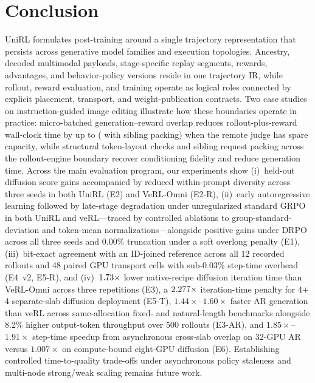 \documentclass[10pt]{article}
\begin{document}
\section{Conclusion}
\label{sec:conclusion}

UniRL formulates post-training around a single trajectory representation that persists across generative model families and execution topologies.
Ancestry, decoded multimodal payloads, stage-specific replay segments, rewards, advantages, and behavior-policy versions reside in one trajectory IR, while rollout, reward evaluation, and training operate as logical roles connected by explicit placement, transport, and weight-publication contracts.
Two case studies on instruction-guided image editing illustrate how these boundaries operate in practice: micro-batched generation--reward overlap reduces rollout-plus-reward wall-clock time by up to \RSSmallOverlapSaving{} (\RSSmallPackedSaving{} with sibling packing) when the remote judge has spare capacity, while structural token-layout checks and sibling request packing across the rollout-engine boundary recover conditioning fidelity and reduce generation time.
Across the main evaluation program, our experiments show (i)~held-out diffusion score gains accompanied by reduced within-prompt diversity across three seeds in both UniRL (E2) and VeRL-Omni (E2-R), (ii)~early autoregressive learning followed by late-stage degradation under unregularized standard GRPO in both UniRL and veRL---traced by controlled ablations to group-standard-deviation and token-mean normalizations---alongside positive gains under DRPO across all three seeds and $0.00\%$ truncation under a soft overlong penalty (E1), (iii)~bit-exact agreement with an ID-joined reference across all 12 recorded rollouts and 48 paired GPU transport cells with sub-0.03\% step-time overhead (E4~v2, E5-R), and (iv)~$1.73{}\times$ lower native-recipe diffusion iteration time than VeRL-Omni across three repetitions (E3), a $2.277{}\times$ iteration-time penalty for 4$+$4 separate-slab diffusion deployment (E5-T), $1.44\times$--$1.60\times$ faster AR generation than veRL across same-allocation fixed- and natural-length benchmarks alongside 8.2\% higher output-token throughput over 500 rollouts (E3-AR), and $1.85\times$--$1.91\times$ step-time speedup from asynchronous cross-slab overlap on 32-GPU AR versus $1.007\times$ on compute-bound eight-GPU diffusion (E6).
Establishing controlled time-to-quality trade-offs under asynchronous policy staleness and multi-node strong/weak scaling remains future work.
\end{document}
